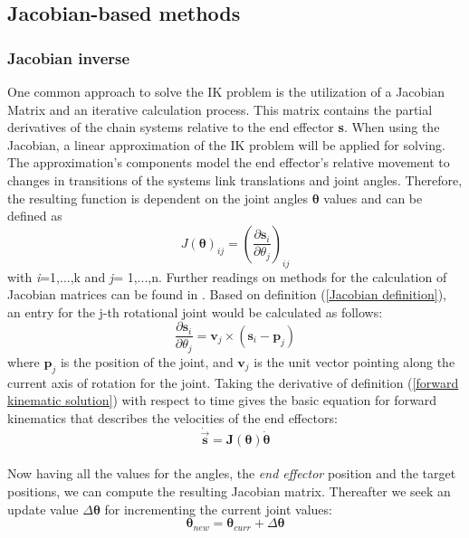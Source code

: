 \subsection{Jacobian-based methods}
\subsubsection{Jacobian inverse}
One common approach to solve the IK problem is the utilization of a Jacobian Matrix and an iterative calculation process. This matrix contains the partial derivatives of the chain systems relative to the end effector \textbf{s}. When using the Jacobian, a linear approximation  of the IK problem will be applied for solving. The approximation's components model the end effector's relative movement to changes in transitions of the systems link translations and joint angles. Therefore, the resulting function is dependent on the joint angles $\pmb{\theta}$ values and can be defined as
\begin{equation}
\label{Jacobian definition}
J(\pmb{\theta})_{ij}=\left(\frac{\partial\textbf{s}_{i}}{\partial\theta_{j}}\right)_{ij}
\end{equation}
with \textit{i}=1,...,k and \textit{j}= 1,...,n.
Further readings on methods for the calculation of Jacobian matrices can be found in \cite{Orin.1984}. Based on definition (\ref{Jacobian definition}), an entry for the j-th rotational joint would be calculated as follows:
\begin{equation}
\label{Jacobian entry calc}
\frac{\partial \textbf{s}_{i}}{\partial \theta_{j}}= \textbf{v}_{j}\times(\textbf{s}_{i}-\textbf{p}_{j})
\end{equation}
where $\textbf{p}_{j}$ is the position of the joint, and $\textbf{v}_{j}$ is the unit vector pointing along the current axis of rotation for the joint.
Taking the derivative of definition (\ref{forward kinematic solution}) with respect to time gives the basic equation for forward kinematics that describes the velocities of the end effectors:
\begin{equation}
\label{fk derivate}
\dot{\vec{\pmb{s}}}=\pmb{J}\pmb{(\theta)}\dot{\pmb{\theta}}
\end{equation}
\\ Now having all the values for the angles, the \textit{end effector} position and the target positions, we can compute the resulting Jacobian matrix.
Thereafter we seek an update value $\Delta\pmb{\theta}$ for incrementing the current joint values:
\begin{equation}
\label{theta calc}
\pmb{\theta}_{new}=\pmb{\theta}_{curr}+\Delta\pmb{\theta}
\end{equation}

